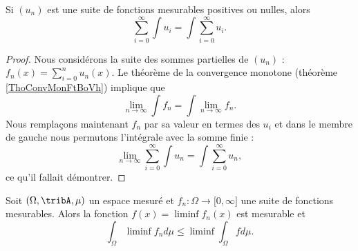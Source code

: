 \begin{corollary}
    Si \( (u_n)\) est une suite de fonctions mesurables positives ou nulles, alors
    \begin{equation}
        \sum_{i=0}^{\infty}\int u_i=\int\sum_{i=0}^{\infty}u_i.
    \end{equation}
\end{corollary}

\begin{proof}
    Nous considérons la suite des sommes partielles de \( (u_n)\) : \( f_n(x)=\sum_{i=0}^nu_n(x)\). Le théorème de la convergence monotone (théorème \ref{ThoConvMonFtBoVh}) implique que
    \begin{equation}
        \lim_{n\to \infty} \int f_n=\int\lim_{n\to \infty} f_n.
    \end{equation}
    Nous remplaçons maintenant \( f_n\) par sa valeur en termes des \( u_i\) et dans le membre de gauche nous permutons l'intégrale avec la somme finie :
    \begin{equation}
        \lim_{n\to \infty} \sum_{i=0}^{\infty}\int u_n=\int\sum_{i=0}^{\infty}u_n,
    \end{equation}
    ce qu'il fallait démontrer.
\end{proof}

\begin{lemma}   \label{LemFatouUOQqyk}
    Soit \( (\Omega,\tribA,\mu)\) un espace mesuré et \( f_n\colon \Omega\to \mathopen[ 0 , \infty \mathclose]  \) une suite de fonctions mesurables. Alors la fonction \( f(x)=\liminf f_n(x)\) est mesurable et
    \begin{equation}
        \int_{\Omega}\liminf f_nd\mu\leq\liminf\int_{\Omega}fd\mu.
    \end{equation}
\end{lemma}

